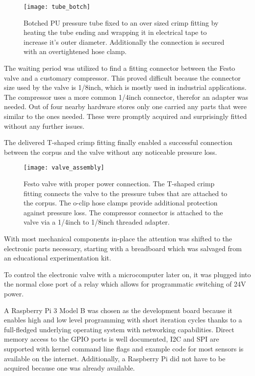\begin{figure}[h]
\centering

\texttt{[image: tube\_botch]}

\caption{Botched PU pressure tube fixed to an over sized crimp fitting by heating the tube ending and wrapping it in electrical tape to increase it's outer diameter. Additionally the connection is secured with an overtightened hose clamp.}
\end{figure}

The waiting period was utilized to find a fitting connector between the Festo valve and a customary compressor. This proved difficult because the connector size used by the valve is 1/8inch, which is mostly used in industrial applications. The compressor uses a more common 1/4inch connector, therefor an adapter was needed. Out of four nearby hardware stores only one carried any parts that were similar to the ones needed. These were promptly acquired and surprisingly fitted without any further issues.

The delivered T-shaped crimp fitting finally enabled a successful connection between the corpus and the valve without any noticeable pressure loss.  

\begin{figure}[h]
\centering

\texttt{[image: valve\_assembly]}

\caption{Festo valve with proper power connection. The T-shaped crimp fitting connects the valve to the pressure tubes that are attached to the corpus. The o-clip hose clamps provide additional protection against pressure loss. The compressor connector is attached to the valve via a 1/4inch to 1/8inch threaded adapter.}
\end{figure}

With most mechanical components in-place the attention was shifted to the electronic parts necessary, starting with a breadboard which was salvaged from an educational experimentation kit. 

To control the electronic valve with a microcomputer later on, it was plugged into the normal close port of a relay which allows for programmatic switching of 24V power. 

A Raspberry Pi 3 Model B \cite{raspberry-pi} was chosen as the development board because it enables high and low level programming with short iteration cycles thanks to a full-fledged underlying operating system \cite{raspbian} with networking capabilities. Direct memory access to the GPIO ports is well documented, I2C and SPI are supported with kernel command line flags and example code for most sensors is available on the internet. Additionally, a Raspberry Pi did not have to be acquired because one was already available.

